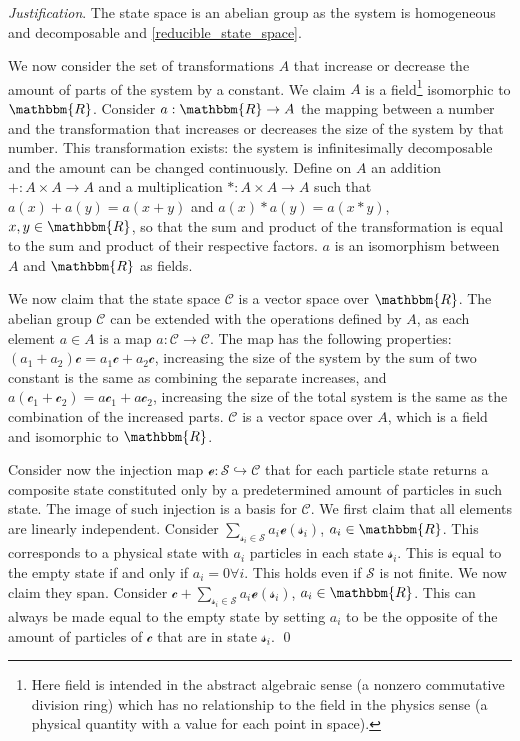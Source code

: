 \documentclass[aps,pra,10pt,twocolumn,floatfix,nofootinbib]{revtex4-1}
\theoremstyle{definition}
\newenvironment{justification}{\emph{Justification}.}{\qed}
\begin{document}
\begin{justification}
The state space is an abelian group as the system is homogeneous and decomposable and \ref{reducible_state_space}.

We now consider the set of transformations $A$ that increase or decrease the amount of parts of the system by a constant. We claim $A$ is a field\footnote{Here field is intended in the abstract algebraic sense (a nonzero commutative division ring) which has no relationship to the field in the physics sense (a physical quantity with a value for each point in space).} isomorphic to $\mathbbm{R}$. Consider $a: \mathbbm{R} \rightarrow A$ the mapping between a number and the transformation that increases or decreases the size of the system by that number. This transformation exists: the system is infinitesimally decomposable and the amount can be changed continuously. Define on $A$ an addition $+: A \times A \rightarrow A$ and a multiplication $*: A \times A \rightarrow A$ such that $a(x) + a(y) = a(x+y)$ and $a(x) * a(y) = a(x*y)$, $x,y \in \mathbbm{R}$, so that the sum and product of the transformation is equal to the sum and product of their respective factors. $a$ is an isomorphism between $A$ and $\mathbbm{R}$ as fields.

We now claim that the state space $\mathcal{C}$ is a vector space over $\mathbbm{R}$. The abelian group $\mathcal{C}$ can be extended with the operations defined by $A$, as each element $a \in A$ is a map $a : \mathcal{C} \rightarrow \mathcal{C}$. The map has the following properties: $(a_1 + a_2) \mathcal{c} = a_1 \mathcal{c} + a_2 \mathcal{c}$, increasing the size of the system by the sum of two constant is the same as combining the separate increases, and $a (\mathcal{c}_1 + \mathcal{c}_2) = a \mathcal{c}_1 + a \mathcal{c}_2$, increasing the size of the total system is the same as the combination of the increased parts. $\mathcal{C}$ is a vector space over $A$, which is a field and isomorphic to $\mathbbm{R}$.

Consider now the injection map $\mathcal{e}: \mathcal{S} \hookrightarrow \mathcal{C}$ that for each particle state returns a composite state constituted only by a predetermined amount of particles in such state. The image of such injection is a basis for $\mathcal{C}$. We first claim that all elements are linearly independent. Consider $\sum\limits_{\mathcal{s}_i \in \mathcal{S}} a_i \mathcal{e}(\mathcal{s}_i)$, $a_i \in \mathbbm{R}$. This corresponds to a physical state with $a_i$ particles in each state $\mathcal{s}_i$. This is equal to the empty state if and only if $a_i=0 \forall i$. This holds even if $\mathcal{S}$ is not finite. We now claim they span. Consider $\mathcal{c} + \sum\limits_{\mathcal{s}_i \in \mathcal{S}} a_i \mathcal{e}(\mathcal{s}_i)$, $a_i \in \mathbbm{R}$. This can always be made equal to the empty state by setting $a_i$ to be the opposite of the amount of particles of $\mathcal{c}$ that are in state $\mathcal{s}_i$.
\end{justification}
\end{document}
